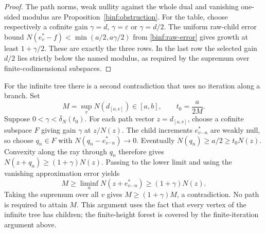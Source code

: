 \begin{proof}
The path norms, weak nullity against the whole dual and vanishing
one-sided modulus are Proposition~\ref{binf:obstruction}.
For the table, choose respectively a cofinite gain
$\gamma=d$, $\gamma=\varepsilon$ or $\gamma=d/2$.
The uniform raw-child error bound
$N(e_v^*-f)<\min(a/2,a\gamma/2)$ from
\eqref{binf:raw-error} gives growth at least $1+\gamma/2$.
These are exactly the three rows. In the last row the selected gain
$d/2$ lies strictly below the named modulus, as required by the
supremum over finite-codimensional subspaces.
\end{proof}


\begin{remark}\label{binf:supremum-obstruction}
For the infinite tree there is a second contradiction that uses no
iteration along a branch. Set
\[
 M=\sup_v N(d_{[o,v]})\in[a,b],\qquad t_0=\frac{a}{2M}.
\]
Suppose $0<\gamma<\overline\delta_N(t_0)$. For each path vector
$z=d_{[o,v]}$, choose a cofinite subspace $F$ giving gain $\gamma$
at $z/N(z)$. The child increments $e_{v^\frown n}^*$ are weakly
null, so choose $q_n\in F$ with
$N(q_n-e_{v^\frown n}^*)\to0$. Eventually
$N(q_n)\ge a/2\ge t_0N(z)$. Convexity along the ray through $q_n$
therefore gives $N(z+q_n)\ge(1+\gamma)N(z)$. Passing to the lower
limit and using the vanishing approximation error yields
\[
 M\ge\liminf_n N(z+e_{v^\frown n}^*)\ge(1+\gamma)N(z).
\]
Taking the supremum over all $v$ gives $M\ge(1+\gamma)M$, a
contradiction. No path is required to attain $M$. This argument uses
the fact that every vertex of the infinite tree has children; the
finite-height forest is covered by the finite-iteration argument above.
\end{remark}
